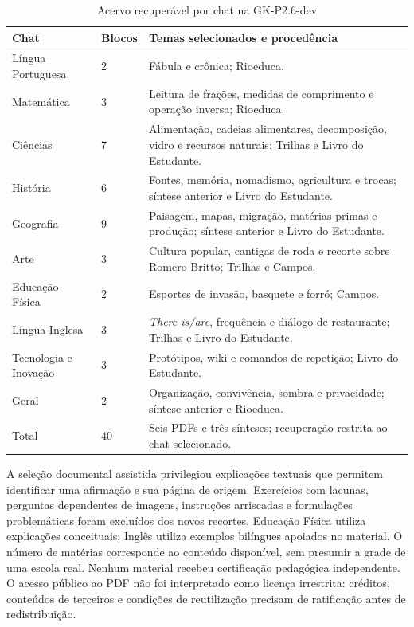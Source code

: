 \begin{table}[htbp]\centering\small\SingleSpacing
\caption{Acervo recuperável por chat na GK-P2.6-dev}\label{tab:corpus}
\begin{tabularx}{\textwidth}{L{2.6cm} L{1.2cm} Y}
\toprule Chat & Blocos & Temas selecionados e procedência \\\midrule
Língua Portuguesa & 2 & Fábula e crônica; Rioeduca. \\
Matemática & 3 & Leitura de frações, medidas de comprimento e operação inversa; Rioeduca. \\
Ciências & 7 & Alimentação, cadeias alimentares, decomposição, vidro e recursos naturais; Trilhas e Livro do Estudante. \\
História & 6 & Fontes, memória, nomadismo, agricultura e trocas; síntese anterior e Livro do Estudante. \\
Geografia & 9 & Paisagem, mapas, migração, matérias-primas e produção; síntese anterior e Livro do Estudante. \\
Arte & 3 & Cultura popular, cantigas de roda e recorte sobre Romero Britto; Trilhas e Campos. \\
Educação Física & 2 & Esportes de invasão, basquete e forró; Campos. \\
Língua Inglesa & 3 & \textit{There is/are}, frequência e diálogo de restaurante; Trilhas e Livro do Estudante. \\
Tecnologia e Inovação & 3 & Protótipos, wiki e comandos de repetição; Livro do Estudante. \\
Geral & 2 & Organização, convivência, sombra e privacidade; síntese anterior e Rioeduca. \\
Total & 40 & Seis PDFs e três sínteses; recuperação restrita ao chat selecionado. \\
\bottomrule\end{tabularx}
\end{table}

A seleção documental assistida privilegiou explicações textuais que permitem identificar uma afirmação e sua página de origem. Exercícios com lacunas, perguntas dependentes de imagens, instruções arriscadas e formulações problemáticas foram excluídos dos novos recortes. Educação Física utiliza explicações conceituais; Inglês utiliza exemplos bilíngues apoiados no material. O número de matérias corresponde ao conteúdo disponível, sem presumir a grade de uma escola real. Nenhum material recebeu certificação pedagógica independente. O acesso público ao PDF não foi interpretado como licença irrestrita: créditos, conteúdos de terceiros e condições de reutilização precisam de ratificação antes de redistribuição.

